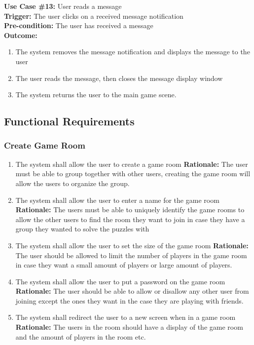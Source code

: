 \documentclass[12pt]{article}
\begin{document}
\textbf{Use Case \#13:} User reads a message\\
\textbf{Trigger:} The user clicks on a received message notification\\
\textbf{Pre-condition:} The user has received a message\\
\textbf{Outcome:}
\begin{enumerate}
        \item The system removes the message notification and displays the message to the user
	\item The user reads the message, then closes the message display window
	\item The system returns the user to the main game scene.
\end{enumerate}

\subsection{Functional Requirements}
\subsubsection{Create Game Room}
\begin{enumerate}[label=CG\arabic*., series=CreateGame]
    \item The system shall allow the user to create a game room \newline \textbf{Rationale:} The user must be able to group together with other users, creating the game room will allow the users to organize the group.
    \item The system shall allow the user to enter a name for the game room \newline
    \textbf{Rationale:} The users must be able to uniquely identify the game rooms to allow the other users to find the room they want to join in case they have a group they wanted to solve the puzzles with
    \item The system shall allow the user to set the size of the game room \newline
    \textbf{Rationale:} The user should be allowed to limit the number of players in the game room in case they want a small amount of players or large amount of players.
    \item The system shall allow the user to put a password on the game room \newline
    \textbf{Rationale:} The user should be able to allow or disallow any other user from joining except the ones they want in the case they are playing with friends.
    \item The system shall redirect the user to a new screen when in a game room \newline
    \textbf{Rationale: } The users in the room should have a display of the game room and the amount of players in the room etc. 
\end{enumerate}
\end{document}

